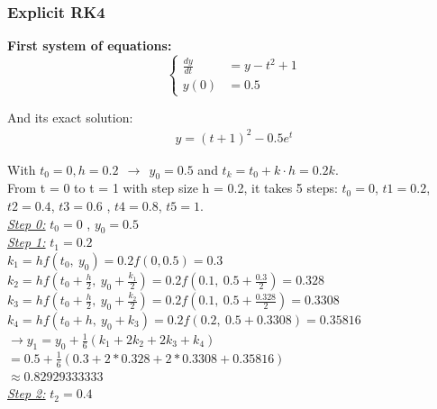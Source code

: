\documentclass[a4paper]{article}
\numberwithin{equation}{section}
\begin{document}
 
 
\subsubsection{Explicit RK4}
\textbf{First system of equations:}
\begin{equation*}
  \begin{cases}
    \frac{dy}{dt} & = y - t^2 +1 \\
    y(0)          & = 0.5
  \end{cases}
\end{equation*}

And its exact solution:
\begin{align*}
   y = (t+1)^2 -0.5e^t
\end{align*} 

With \(t_0 = 0, h=0.2 ~~\rightarrow ~~ y_0 = 0.5\) and \(t_k = t_0 + k \cdot h = 0.2k\).\\

From t = 0 to t = 1 with step size h = 0.2, it takes 5 steps: \(t_0 = 0\), \(t1 = 0.2\), \(t2 = 0.4\), \(t3 = 0.6\) , \(t4 = 0.8\), \(t5 = 1\).\\

\underline{\textit{Step 0:}} \(t_0=0\) , \(y_0=0.5\) \\

\underline{\textit{Step 1:}} \(t_1=0.2\)\\

  $k_1 = hf(t_0,~ y_0) = 0.2f(0, 0.5) = 0.3$\\
  
  $k_2 = hf \left(t_0 + \frac{h}{2},~ y_0 + \frac{k_1}{2}\right) = 0.2f(0.1,~ 0.5+\frac{0.3}{2}) = 0.328$\\  
  
  $k_3 = hf \left(t_0 + \frac{h}{2},~ y_0 + \frac{k_2}{2}\right) = 0.2f(0.1,~ 0.5+\frac{0.328}{2}) = 0.3308$ \\
  
  $k_4 = hf(t_0 + h,~ y_0 + k_3) = 0.2f(0.2,~ 0.5+0.3308) = 0.35816$\\
  
  $\rightarrow y_1 = y_0 + \frac{1}{6}(k_1 + 2k_2 + 2k_3 + k_4)$\\
  
  $= 0.5 + \frac{1}{6}(0.3 + 2 * 0.328 + 2 * 0.3308 + 0.35816 )$\\ 
  
  $\approx 0.82929333333$\\

\underline{\textit{Step 2:}} \(t_2=0.4\)\\
\end{document}
